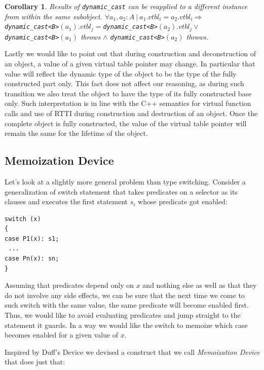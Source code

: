 \documentclass[preprint]{sigplanconf}
\makeatletter
\DeclareRobustCommand{\code}[1]{{\lstinline[breaklines=false,escapechar=@]{#1}}}
\newtheorem{corollary}{Corollary}
\makeatother
\begin{document}
\begin{corollary}
Results of \code{dynamic_cast} can be reapplied to a different instance from within the same subobject.
$\forall a_1, a_2 : A\ |\ a_1.vtbl_i = a_2.vtbl_i \Rightarrow$
\code{dynamic_cast<B>}$(a_1).vtbl_j = $\code{dynamic_cast<B>}$(a_2).vtbl_j \vee$ \\
\code{dynamic_cast<B>}$(a_1)$ throws $\wedge$ \code{dynamic_cast<B>}$(a_2)$ 
throws.
\label{crl:vtbl}
\end{corollary}

Lastly we would like to point out that during construction and deconstruction of 
an object, a value of a given virtual table pointer may change. In particular 
that value will reflect the dynamic type of the object to be the type of the 
fully constructed part only. This fact does not affect our reasoning, as during 
such transition we also treat the object to have the type of its fully 
constructed base only. Such interpretation is in line with the C++ semantics for 
virtual function calls and use of RTTI during construction and destruction of an 
object. Once the complete object is fully constructed, the value of the virtual 
table pointer will remain the same for the lifetime of the object.

\subsection{Memoization Device}
\label{sec:memdev}

Let's look at a slightly more general problem than type switching. Consider a 
generalization of switch statement that takes predicates on a selector as its 
clauses and executes the first statement $s_i$ whose predicate got enabled: 

\begin{lstlisting}
switch (x)
{
case P1(x): s1;
 ...
case Pn(x): sn;
}
\end{lstlisting}

\noindent
Assuming that predicates depend only on $x$ and nothing else as well as that 
they do not involve any side effects, we can be sure that the next time we come 
to such switch with the same value, the same predicate will become enabled 
first. Thus, we would like to avoid evaluating predicates and jump straight to 
the statement it guards. In a way we would like the switch to  memoize which 
case becomes enabled for a given value of $x$.

Inspired by Duff's Device\cite{Duff} we devised a construct that we call 
\emph{Memoization Device} that does just that:
\end{document}
